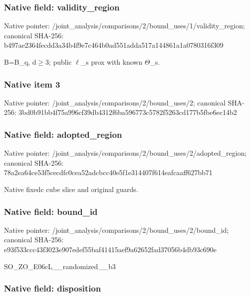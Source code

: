 \documentclass[10pt,a4paper]{article}
\begin{document}
\subsubsection{Native field: validity\_region}


Native pointer: /joint\_analysis/comparis\allowbreak{}ons/2/bound\_uses/1/valid\allowbreak{}ity\_region; canonical SHA-256: b497ae2364fecdd3a34b4f9e\allowbreak{}7c464b0ad551adda517a1448\allowbreak{}61a1a0780316f309


B=B\_q, d\ensuremath{\ge}3; public \ensuremath{\ell}\_s prox with known \ensuremath{\Theta}\_s.


\subsubsection{Native item 3}


Native pointer: /joint\_analysis/comparis\allowbreak{}ons/2/bound\_uses/2; canonical SHA-256: 3bd0b91bb4f75a996cf39db4\allowbreak{}312f6ba596773c5782f5263c\allowbreak{}d177b5fbe6ec14b2



\subsubsection{Native field: adopted\_region}


Native pointer: /joint\_analysis/comparis\allowbreak{}ons/2/bound\_uses/2/adopt\allowbreak{}ed\_region; canonical SHA-256: 78a2ea64ce53f5cecdfc0cea\allowbreak{}52adcbcc40e5f1e314407f61\allowbreak{}4eafcaaff627bb71


Native fixedc cube slice and original guards.


\subsubsection{Native field: bound\_id}


Native pointer: /joint\_analysis/comparis\allowbreak{}ons/2/bound\_uses/2/bound\allowbreak{}\_id; canonical SHA-256: e93f533ccc43f3023e907ede\allowbreak{}f55baf41415aef9a62652fad\allowbreak{}37056b4db93c690e


SO\_ZO\_E06cL\_\_randomized\_\_b3


\subsubsection{Native field: disposition}
\end{document}
